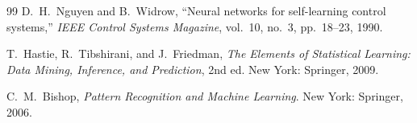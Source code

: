 \documentclass[11pt,a4paper]{article}
\begin{document}
\begin{thebibliography}{99}
D.~H.~Nguyen and B.~Widrow,
``Neural networks for self-learning control systems,''
\textit{IEEE Control Systems Magazine}, vol.~10, no.~3, pp.~18--23, 1990.

T.~Hastie, R.~Tibshirani, and J.~Friedman,
\textit{The Elements of Statistical Learning: Data Mining, Inference, and Prediction},
2nd ed. New York: Springer, 2009.

C.~M.~Bishop,
\textit{Pattern Recognition and Machine Learning}.
New York: Springer, 2006.

\end{thebibliography}
\end{document}
